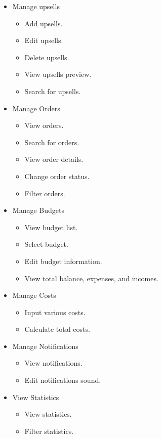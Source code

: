\begin{itemize}
    \item Manage upsells
    \begin{itemize}
        \item Add upsells.
        \item Edit upsells.
        \item Delete upsells.
        \item View upsells preview.
        \item Search for upsells.
    \end{itemize}
    
    \item Manage Orders
    \begin{itemize}
        \item View orders.
        \item Search for orders.
        \item View order details.
        \item Change order status.
        \item Filter orders.
    \end{itemize}
    
    \item Manage Budgets
    \begin{itemize}
        \item View budget list.
        \item Select budget.
        \item Edit budget information.
        \item View total balance, expenses, and incomes.
    \end{itemize}
    
    \item Manage Costs
    \begin{itemize}
        \item Input various costs.
        \item Calculate total costs.
    \end{itemize}
    
    \item Manage Notifications
    \begin{itemize}
        \item View notifications.
        \item Edit notifications sound.
    \end{itemize}
    
    \item View Statistics
    \begin{itemize}
        \item View statistics.
        \item Filter statistics.
    \end{itemize}
\end{itemize}

